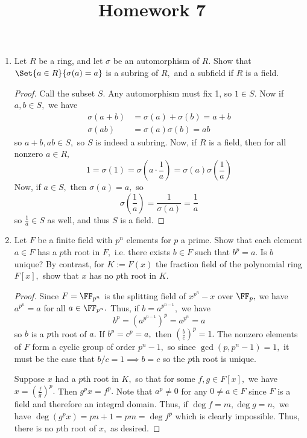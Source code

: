 \documentclass{article}
\begin{document}
\title{Homework 7}
\maketitle
\thispagestyle{fancy}

\begin{enumerate}
	\item Let $R$ be a ring, and let $\sigma$ be an automorphism of $R.$ Show that $\Set{a\in R}{\sigma(a)=a}$ is a subring of $R,$ and a subfield if $R$ is a field.
		\begin{proof}
			Call the subset $S.$ Any automorphism must fix 1, so $1\in S.$ Now if $a, b\in S,$ we have
			\begin{align*}
				\sigma(a+b) &= \sigma(a)+\sigma(b) = a+b \\
				\sigma(ab) &= \sigma(a)\sigma(b)=ab
			\end{align*}
			so $a+b, ab\in S,$ so $S$ is indeed a subring. Now, if $R$ is a field, then for all nonzero $a\in R,$
			\[1=\sigma(1)=\sigma\left( a\cdot \frac{1}{a} \right) = \sigma(a) \sigma\left( \frac{1}{a} \right)\]
			Now, if $a\in S,$ then $\sigma(a)=a,$ so
			\[\sigma\left( \frac{1}{a} \right) = \frac{1}{\sigma(a)}=\frac{1}{a}\]
			so $\frac{1}{a}\in S$ as well, and thus $S$ is a field.
		\end{proof}

	\item Let $F$ be a finite field with $p^n$ elements for $p$ a prime. Show that each element $a\in F$ has a $p$th root in $F,$ i.e. there exists $b\in F$ such that $b^p=a.$ Is $b$ unique? By contrast, for $K:=F(x)$ the fraction field of the polynomial ring $F[x],$ show that $x$ has no $p$th root in $K.$
		\begin{proof}
			Since $F=\FF_{p^n}$ is the splitting field of $x^{p^n}-x$ over $\FF_p,$ we have $a^{p^n}=a$ for all $a\in \FF_{p^n}.$ Thus, if $b=a^{p^{n-1}},$ we have
			\[b^p=(a^{p^{n-1}})^p = a^{p^n}=a\]
			so $b$ is a $p$th root of $a.$ If $b^p=c^p=a,$ then $\left( \frac{b}{c} \right)^p=1.$ The nonzero elements of $F$ form a cyclic group of order $p^n-1,$ so since $\gcd(p, p^n-1)=1,$ it must be the case that $b/c=1\implies b=c$ so the $p$th root is unique.

			Suppose $x$ had a $p$th root in $K,$ so that for some $f, g\in F[x],$ we have $x=\left( \frac{f}{g} \right)^p.$ Then $g^px=f^p.$ Note that $a^p\neq 0$ for any $0\neq a\in F$ since $F$ is a field and therefore an integral domain. Thus, if $\deg f = m, \deg g=n,$ we have $\deg (g^px)=pn+1=pm=\deg f^p$ which is clearly impossible. Thus, there is no $p$th root of $x,$ as desired.
		\end{proof}
		
\end{enumerate}
\end{document}
